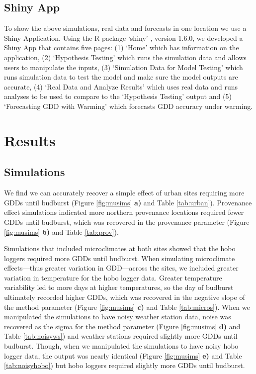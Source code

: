 \documentclass{article}\usepackage[]{graphicx}\usepackage[]{color}
\begin{document}
\subsection*{Shiny App}
To show the above simulations, real data and forecasts in one location we use a Shiny Application. Using the R package `shiny' \citep{shiny2021}, version 1.6.0, we developed a Shiny App that contains five pages: (1) `Home' which has information on the application, (2) `Hypothesis Testing' which runs the simulation data and allows users to manipulate the inputs, (3) `Simulation Data for Model Testing' which runs simulation data to test the model and make sure the model outputs are accurate, (4) `Real Data and Analyze Results' which uses real data and runs analyses to be used to compare to the `Hypothesis Testing' output and (5) `Forecasting GDD with Warming' which forecasts GDD accuracy under warming. 

\section*{Results}
\subsection*{Simulations}
We find we can accurately recover a simple effect of urban sites requiring more GDDs until budburst (Figure \ref{fig:musims} \textbf{a)} and Table \ref{tab:urban}). Provenance effect simulations indicated more northern provenance locations required fewer GDDs until budburst, which was recovered in the provenance parameter (Figure \ref{fig:musims} \textbf{b)} and Table \ref{tab:prov}). 

Simulations that included microclimates at both sites showed that the hobo loggers required more GDDs until budburst. When simulating microclimate effects---thus greater variation in GDD---across the sites, we included greater variation in temperature for the hobo logger data. Greater temperature variability led to more days at higher temperatures, so the day of budburst ultimately recorded higher GDDs, which was recovered in the negative slope of the method parameter (Figure \ref{fig:musims} \textbf{c)} and Table \ref{tab:micros}). When we manipulated the simulations to have noisy weather station data, noise was recovered as the sigma for the method parameter (Figure \ref{fig:musims} \textbf{d)} and Table \ref{tab:noisyws}) and weather stations required slightly more GDDs until budburst. Though, when we manipulated the simulations to have noisy hobo logger data, the output was nearly identical (Figure \ref{fig:musims} \textbf{e)} and Table \ref{tab:noisyhobo}) but hobo loggers required slightly more GDDs until budburst.
  
\end{document}
